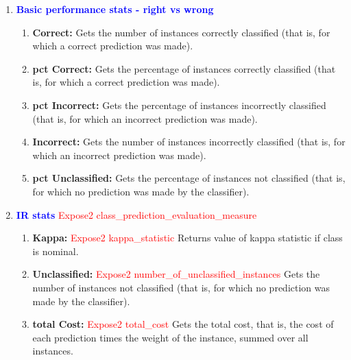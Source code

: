 \documentclass[a4paper,12pt, english]{article}
\begin{document}
\begin{enumerate}

\item \textbf{\textcolor{blue}{Basic performance stats - right vs wrong}}
\begin{enumerate}
              
\item \textbf{Correct: }
          Gets the number of instances correctly classified (that is, for which a correct prediction was made).
          
\item \textbf{pct Correct: }
          Gets the percentage of instances correctly classified (that is, for which a correct prediction was made). 

\item \textbf{pct Incorrect: }
          Gets the percentage of instances incorrectly classified (that is, for which an incorrect prediction was made).

\item \textbf{Incorrect: }
          Gets the number of instances incorrectly classified (that is, for which an incorrect prediction was made). 
          
\item \textbf{pct Unclassified: }
          Gets the percentage of instances not classified (that is, for which no prediction was made by the classifier). 


          
          

          
\end{enumerate}    




\item  \textbf{\textcolor{blue}{IR stats}} \textcolor{red}{Expose2 class\_prediction\_evaluation\_measure}
\begin{enumerate}          
   \item \textbf{Kappa: } \textcolor{red}{Expose2 kappa\_statistic}
          Returns value of kappa statistic if class is nominal. 

\item \textbf{Unclassified: } \textcolor{red}{Expose2 number\_of\_unclassified\_instances} 
          Gets the number of instances not classified (that is, for which no prediction was made by the classifier).
          
\item \textbf{total Cost: }  \textcolor{red}{Expose2 total\_cost}
          Gets the total cost, that is, the cost of each prediction times the weight of the instance, summed over all instances.      


\end{enumerate}
\end{enumerate}
\end{document}

